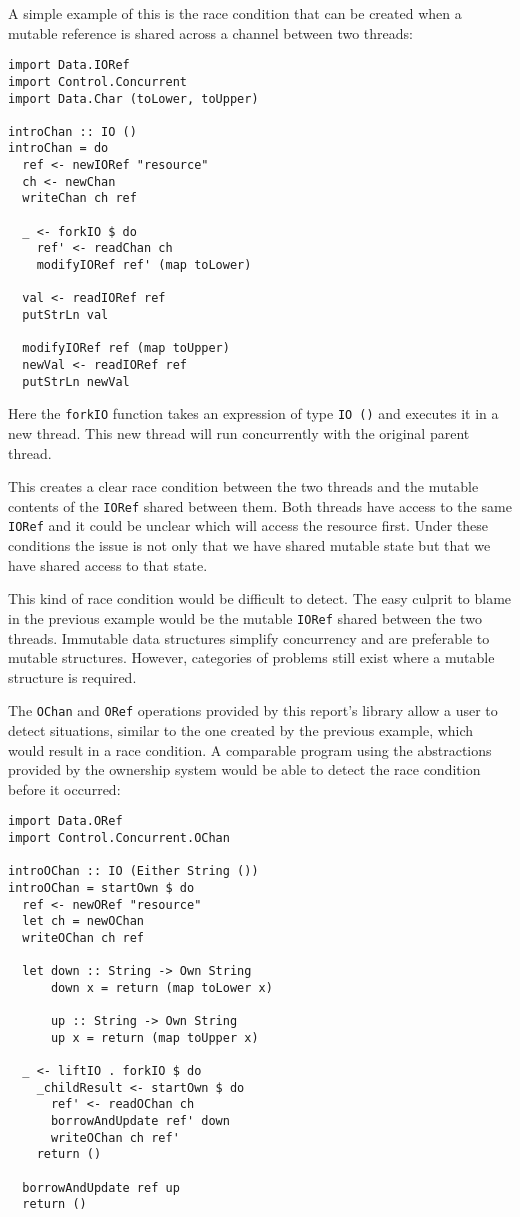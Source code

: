 \documentclass[onehalf,11pt]{beavtex}
\begin{document}
\newpage

A simple example of this is the race condition that can be created when a
mutable reference is shared across a channel between two threads:

\begin{lstlisting}
import Data.IORef
import Control.Concurrent
import Data.Char (toLower, toUpper)

introChan :: IO ()
introChan = do
  ref <- newIORef "resource"
  ch <- newChan
  writeChan ch ref

  _ <- forkIO $ do
    ref' <- readChan ch
    modifyIORef ref' (map toLower)

  val <- readIORef ref
  putStrLn val

  modifyIORef ref (map toUpper)
  newVal <- readIORef ref
  putStrLn newVal
\end{lstlisting}

Here the \texttt{forkIO} function takes an expression of type \texttt{IO ()}
and executes it in a new thread.
This new thread will run concurrently with the original parent thread.

This creates a clear race condition between the two threads and the mutable
contents of the \texttt{IORef} shared between them.
Both threads have access to the same \texttt{IORef} and it could be unclear
which will access the resource first.  Under these conditions the issue is not
only that we have shared mutable state but that we have shared access to that
state.

This kind of race condition would be difficult to detect. 
The easy culprit to blame in the previous example would be the
mutable \texttt{IORef} shared between the two threads.
Immutable data structures simplify concurrency and are preferable to
mutable structures. However, categories of problems still exist where a
mutable structure is required.

The \texttt{OChan} and \texttt{ORef} operations provided by this report's library
allow a user to detect situations, similar to the one created by the previous
example, which would result in a race condition.
A comparable program using the abstractions provided by the ownership system
would be able to detect the race condition before it occurred:

\begin{lstlisting}
import Data.ORef
import Control.Concurrent.OChan

introOChan :: IO (Either String ())
introOChan = startOwn $ do
  ref <- newORef "resource"
  let ch = newOChan
  writeOChan ch ref

  let down :: String -> Own String
      down x = return (map toLower x)

      up :: String -> Own String
      up x = return (map toUpper x)

  _ <- liftIO . forkIO $ do
    _childResult <- startOwn $ do
      ref' <- readOChan ch
      borrowAndUpdate ref' down
      writeOChan ch ref'
    return ()

  borrowAndUpdate ref up
  return ()
\end{lstlisting}
\end{document}
